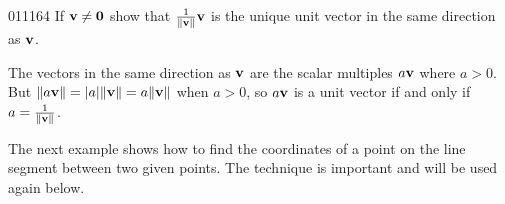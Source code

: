 \vspace{2em}
\begin{example}{}{011164}
If $\textbf{v} \neq \textbf{0}$ show that $\tfrac{1}{\| \textbf{v} \|} \textbf{v}$ is the unique unit vector in the same direction as $\textbf{v}$.


\begin{solution}
  The vectors in the same direction as $\textbf{v}$ are the scalar multiples $a\textbf{v}$ where $a > 0$. But $\| a\textbf{v} \| = |a| \| \textbf{v} \| = a \| \textbf{v} \|$ when $a > 0$, so $a\textbf{v}$ is a unit vector if and only if $a = \tfrac{1}{\| \textbf{v} \|}$.
\end{solution}
\end{example}

The
 next example shows how to find the coordinates of a point on the line 
segment between two given points. The technique is important and will be
 used again below.

